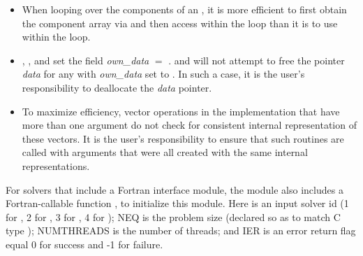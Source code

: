 \begin{itemize}
                                        
\item
  When looping over the components of an  , it is     
  more efficient to first obtain the component array via       
   and then access  within the     
  loop than it is to use  within the loop.        

\item
  {\warn}, , 
  and  set the field 
  {\em own\_data} $=$ . 
   and 
  will not attempt to free the pointer {\em data} for any  with
  {\em own\_data} set to . In such a case, it is the user's responsibility to
  deallocate the {\em data} pointer.
                                     
\item
  {\warn}To maximize efficiency, vector operations in the {\nvecpthreads} implementation
  that have more than one  argument do not check for
  consistent internal representation of these vectors. It is the user's 
  responsibility to ensure that such routines are called with 
  arguments that were all created with the same internal representations.

\end{itemize}

For solvers that include a Fortran interface module, the {\nvecpthreads}
module also includes a Fortran-callable function
, to initialize this
module.  Here  is an input solver id
(1 for {\cvode}, 2 for {\ida}, 3 for {\kinsol}, 4 for {\arkode}); NEQ is
the problem size (declared so as to match C type );
NUMTHREADS is the number of threads; and IER is an error return flag
equal 0 for success and -1 for failure.

